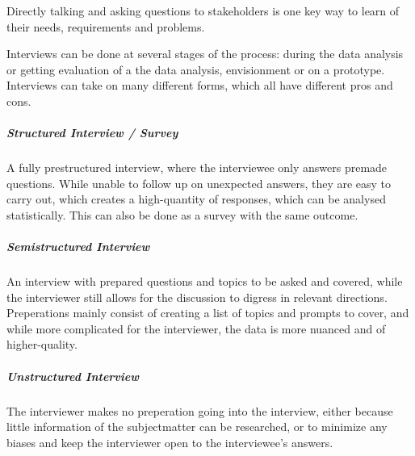 \begin{method}[Interview] \label{meth:interview} 
  Directly talking and asking questions to stakeholders is one key way to learn
  of their needs, requirements and problems. 
  
  Interviews can be done at several stages of the process: during the data
  analysis or getting evaluation of a the data analysis, envisionment or on a
  prototype. Interviews can take on many different forms, which all have different pros and
  cons.
  \cite[p. 142-146]{benyon_14}
\end{method}

\subparagraph{Structured Interview / Survey}  
A fully prestructured interview, where the interviewee only answers premade
questions. While unable to follow up on unexpected answers, they are easy to
carry out, which creates a high-quantity of responses, which can be analysed
statistically. This can also be done as a survey with the same outcome. 
\cite[p. 142]{benyon_14}

\subparagraph{Semistructured Interview} 
An interview with prepared questions and topics to be asked and covered, while
the interviewer still allows for the discussion to digress in relevant
directions. Preperations mainly consist of creating a list of topics and prompts
to cover, and while more complicated for the interviewer, the data is more
nuanced and of higher-quality.
\cite[p. 143]{beynon_14}

\subparagraph{Unstructured Interview} 
The interviewer makes no preperation going into the interview, either because
little information of the subjectmatter can be researched, or to minimize any
biases and keep the interviewer open to the interviewee's answers.
\cite[p. 143]{benyon_14}
